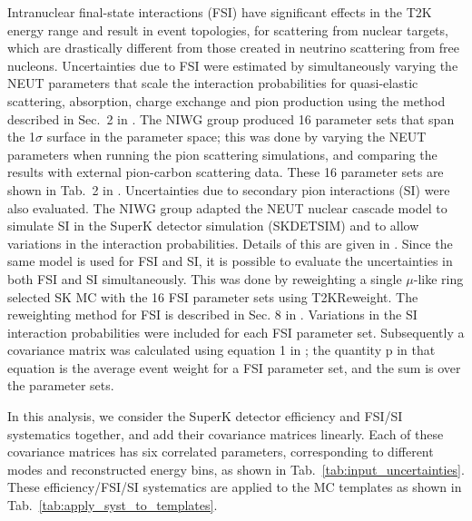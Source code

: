 \begin{enumerate}
Intranuclear final-state interactions (FSI) have significant effects in the T2K energy range and
result in event topologies, for scattering from nuclear targets, which are drastically different from 
those created in neutrino scattering from free nucleons.
Uncertainties due to FSI were estimated by simultaneously varying the NEUT parameters that scale the interaction probabilities for quasi-elastic 
scattering, absorption, charge exchange and pion production using the method described in Sec.\ 2 in \cite{NIWGErr}. The NIWG group produced 16 
parameter sets that span the 1$\sigma$ surface in the parameter space; this was done by varying the NEUT parameters when running the pion scattering 
simulations, and comparing the results with external pion-carbon scattering data. These 16 parameter sets are shown in Tab.\ 2 in \cite{NIWGErr}. 
Uncertainties due to secondary pion interactions (SI) were also evaluated. The NIWG group adapted the NEUT nuclear cascade model to simulate SI in the 
SuperK detector simulation (SKDETSIM) and to allow variations in the interaction probabilities. Details of this are given in \cite{SI}. 
Since the same model is used for FSI and SI, it is possible to evaluate the uncertainties in both FSI and SI simultaneously. This was done by 
reweighting a single $\mu$-like ring selected SK MC with the 16 FSI parameter sets using T2KReweight. The reweighting method for FSI is described 
in Sec. 8 in \cite{NEUTnuclear}. Variations in the SI interaction probabilities were included for each FSI parameter set.  Subsequently a covariance 
matrix was calculated using equation 1 in \cite{NIWGErr}; the quantity p in that equation is the average event weight for a FSI parameter set, and 
the sum is over the parameter sets.

In this analysis, we consider the SuperK detector efficiency and FSI/SI systematics together, and add their covariance matrices linearly. Each of 
these covariance matrices has six correlated parameters, corresponding to different modes and reconstructed energy bins, as shown in Tab.\ \ref{tab:input_uncertainties}.
These efficiency/FSI/SI systematics are applied to the MC templates as shown in Tab.\ \ref{tab:apply_syst_to_templates}.\\


\end{enumerate}
